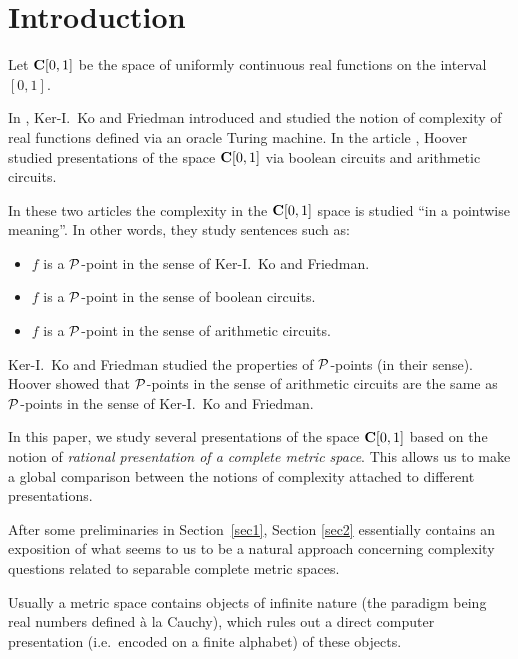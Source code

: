\section*{Introduction}\label{sec0}
Let ${{\bf C}[0,1]}$ be the space of uniformly continuous real functions on the interval 
$[0,1]$.

\smallskip In \cite{KF82}, Ker-I.\ Ko and Friedman introduced and studied the notion of complexity of real functions defined via an oracle Turing machine. 
In the article \cite{Ho90}, Hoover studied presentations of the space 
${{\bf C}[0,1]}$  via boolean circuits and arithmetic circuits.

In these two articles the complexity in the ${{\bf C}[0,1]}$ space is studied ``in a pointwise meaning''. In other words, they study sentences such as: 
\begin{itemize}

\item 
$f$ is a ${\cal P}$-point in the sense of Ker-I.\ Ko and Friedman.

\item 
$f$ is a ${\cal P}$-point in the sense of boolean circuits.

\item 
$f$ is a ${\cal P}$-point in the sense of arithmetic circuits.
\end{itemize}

Ker-I.\ Ko and Friedman studied the properties of ${\cal P}$-points (in their sense). 
Hoover showed that ${\cal P}$-points in the sense of arithmetic circuits are the same as ${\cal P}$-points in the sense of Ker-I.\ Ko and Friedman.

\medskip In this paper, we study several presentations of the space ${{\bf C}[0,1]}$ based on the notion of {\em rational presentation of a complete metric space}. 
This allows us to make a global comparison between the notions of complexity attached to different presentations.
 
\medskip After some preliminaries in Section~\ref{sec1}, Section \ref{sec2} essentially contains an exposition of what seems to us to be a natural approach concerning complexity questions related to separable complete metric spaces. 

\smallskip 
Usually a metric space contains objects of infinite nature (the paradigm being real numbers defined à la Cauchy), which rules out a direct computer presentation (i.e.\ encoded on a finite alphabet) of these objects.

